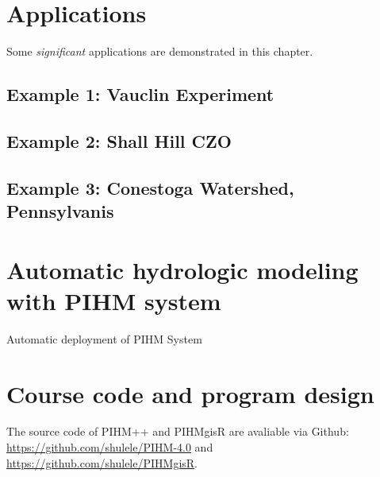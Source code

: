 \documentclass[]{scrbook}
\begin{document}
\chapter{Applications}\label{applications}

Some \emph{significant} applications are demonstrated in this chapter.

\section{Example 1: Vauclin
Experiment}\label{example-1-vauclin-experiment}

\section{Example 2: Shall Hill CZO}\label{example-2-shall-hill-czo}

\section{Example 3: Conestoga Watershed,
Pennsylvanis}\label{example-3-conestoga-watershed-pennsylvanis}

\chapter{Automatic hydrologic modeling with PIHM
system}\label{automatic-hydrologic-modeling-with-pihm-system}

Automatic deployment of PIHM System

\chapter{Course code and program
design}\label{course-code-and-program-design}

The source code of PIHM++ and PIHMgisR are avaliable via Github:
\url{https://github.com/shulele/PIHM-4.0} and
\url{https://github.com/shulele/PIHMgisR}.


\end{document}

